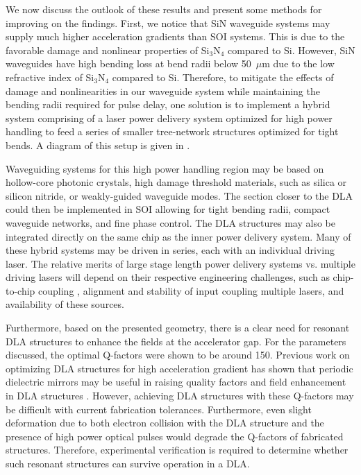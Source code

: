 
We now discuss the outlook of these results and present some methods for improving on the findings.
First, we notice that SiN waveguide systems may supply much higher acceleration gradients than SOI systems.  This is due to the favorable damage and nonlinear properties of Si$_3$N$_4$ compared to Si.  However, SiN waveguides have high bending loss at bend radii below 50~$\mu$m due to the low refractive index of Si$_3$N$_4$ compared to Si.  Therefore, to mitigate the effects of damage and nonlinearities in our waveguide system while maintaining the bending radii required for pulse delay, one solution is to implement a hybrid system comprising of a laser power delivery system optimized for high power handling to feed a series of smaller tree-network structures optimized for tight bends. A diagram of this setup is given in . 


Waveguiding systems for this high power handling region may be based on hollow-core photonic crystals, high damage threshold materials, such as silica or silicon nitride, or weakly-guided waveguide modes. The section closer to the DLA could then be implemented in SOI allowing for tight bending radii, compact waveguide networks, and fine phase control.  The DLA structures may also be integrated directly on the same chip as the inner power delivery system.  Many of these hybrid systems may be driven in series, each with an individual driving laser.  The relative merits of large stage length power delivery systems vs. multiple driving lasers will depend on their respective engineering challenges, such as chip-to-chip coupling \cite{shoji2002low,sacher2017tri}, alignment and stability of input coupling multiple lasers, and availability of these sources.  

Furthermore, based on the presented geometry, there is a clear need for resonant DLA structures to enhance the fields at the accelerator gap. For the parameters discussed, the optimal Q-factors were shown to be around 150. Previous work on optimizing DLA structures for high acceleration gradient has shown that periodic dielectric mirrors may be useful in raising quality factors and field enhancement in DLA structures \cite{hughes_method_2017, mizrahi2004optical, niedermayer2017designing, wei2017dual}. However, achieving DLA structures with these Q-factors may be difficult with current fabrication tolerances. Furthermore, even slight deformation due to both electron collision with the DLA structure and the presence of high power optical pulses would degrade the Q-factors of fabricated structures. Therefore, experimental verification is required to determine whether such resonant structures can survive operation in a DLA.

